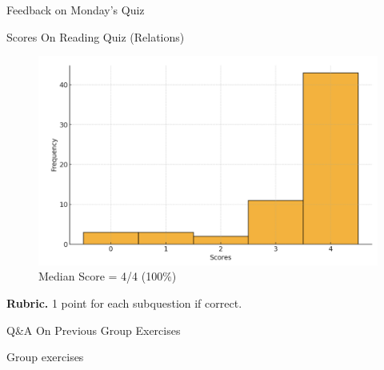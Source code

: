 \documentclass[10pt]{beamer}
\begin{document}
\begin{frame}[standout]
Feedback on Monday's Quiz	
\end{frame}


\begin{frame}{Scores On Reading Quiz (Relations)}
\footnotesize 
\begin{figure}[ht]
        \centering
        \includegraphics[width=.75\textwidth]{images/reading_quiz_scores}
   		 \caption{Median Score = 4/4 (100\%)}
\end{figure}
\vfill 
\textbf{Rubric.}  1 point for each subquestion if correct.

\end{frame}

\begin{frame}[standout]
Q\&A On Previous Group Exercises
\end{frame}

\begin{frame}[standout]
Group exercises
\end{frame}
\end{document}
